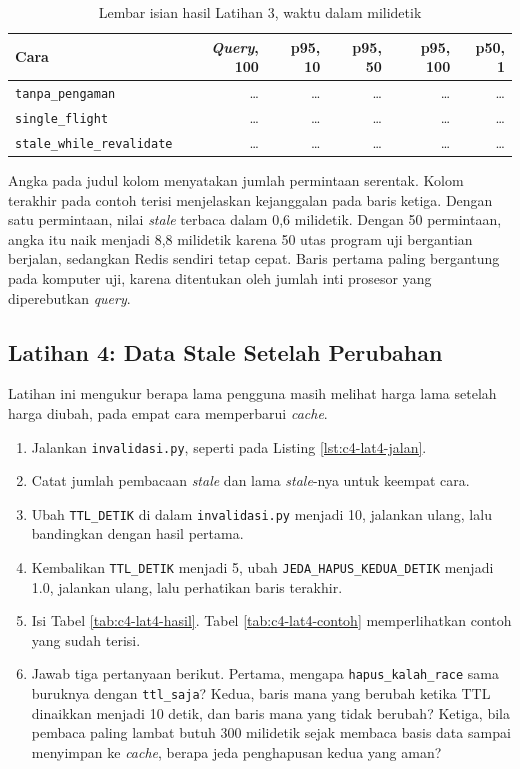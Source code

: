 \begin{table}[!htb]
  \centering
  \caption{Lembar isian hasil Latihan 3, waktu dalam milidetik}
  \label{tab:c4-lat3-hasil}
  \begin{tabularx}{\textwidth}{Xrrrrr}
    \hline
    \textbf{Cara} & \textbf{\textit{Query}, 100} & \textbf{p95, 10} & \textbf{p95, 50} & \textbf{p95, 100} & \textbf{p50, 1} \\
    \hline
    \texttt{tanpa\_pengaman} & \dots & \dots & \dots & \dots & \dots \\
    \hline
    \texttt{single\_flight} & \dots & \dots & \dots & \dots & \dots \\
    \hline
    \texttt{stale\_while\_revalidate} & \dots & \dots & \dots & \dots & \dots \\
    \hline
  \end{tabularx}
\end{table}

Angka pada judul kolom menyatakan jumlah permintaan serentak. Kolom terakhir
pada contoh terisi menjelaskan kejanggalan pada baris ketiga. Dengan satu
permintaan, nilai \textit{stale} terbaca dalam 0,6 milidetik. Dengan 50 permintaan, angka
itu naik menjadi 8,8 milidetik karena 50 utas program uji bergantian berjalan,
sedangkan Redis sendiri tetap cepat. Baris pertama paling bergantung pada
komputer uji, karena ditentukan oleh jumlah inti prosesor yang diperebutkan
\textit{query}.

\subsection*{Latihan 4: Data Stale Setelah Perubahan}

Latihan ini mengukur berapa lama pengguna masih melihat harga lama setelah
harga diubah, pada empat cara memperbarui \textit{cache}.

\begin{enumerate}
  \item Jalankan \texttt{invalidasi.py}, seperti pada Listing
        \ref{lst:c4-lat4-jalan}.
  \item Catat jumlah pembacaan \textit{stale} dan lama \textit{stale}-nya untuk keempat cara.
  \item Ubah \texttt{TTL\_DETIK} di dalam \texttt{invalidasi.py} menjadi 10,
        jalankan ulang, lalu bandingkan dengan hasil pertama.
  \item Kembalikan \texttt{TTL\_DETIK} menjadi 5, ubah
        \texttt{JEDA\_HAPUS\_KEDUA\_DETIK} menjadi 1.0, jalankan ulang, lalu
        perhatikan baris terakhir.
  \item Isi Tabel \ref{tab:c4-lat4-hasil}. Tabel \ref{tab:c4-lat4-contoh}
        memperlihatkan contoh yang sudah terisi.
  \item Jawab tiga pertanyaan berikut. Pertama, mengapa
        \texttt{hapus\_kalah\_race} sama buruknya dengan
        \texttt{ttl\_saja}? Kedua, baris mana yang berubah ketika TTL dinaikkan
        menjadi 10 detik, dan baris mana yang tidak berubah? Ketiga, bila
        pembaca paling lambat butuh 300 milidetik sejak membaca basis data
        sampai menyimpan ke \textit{cache}, berapa jeda penghapusan kedua yang
        aman?
\end{enumerate}

